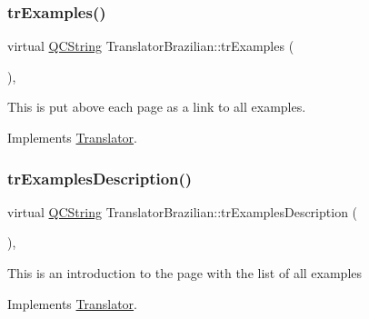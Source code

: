 \mbox{\label{class_translator_brazilian_ac28d1f1400883ca9671356b129312823}} 
\subsubsection{\texorpdfstring{trExamples()}{trExamples()}}
{\footnotesize\ttfamily virtual \mbox{\hyperlink{class_q_c_string}{Q\+C\+String}} Translator\+Brazilian\+::tr\+Examples (\begin{DoxyParamCaption}{ }\end{DoxyParamCaption})\hspace{0.3cm}{\ttfamily [inline]}, {\ttfamily [virtual]}}

This is put above each page as a link to all examples. 

Implements \mbox{\hyperlink{class_translator}{Translator}}.

\mbox{\label{class_translator_brazilian_a0735b11722a71ac5fab8825898ec5e7b}} 
\subsubsection{\texorpdfstring{trExamplesDescription()}{trExamplesDescription()}}
{\footnotesize\ttfamily virtual \mbox{\hyperlink{class_q_c_string}{Q\+C\+String}} Translator\+Brazilian\+::tr\+Examples\+Description (\begin{DoxyParamCaption}{ }\end{DoxyParamCaption})\hspace{0.3cm}{\ttfamily [inline]}, {\ttfamily [virtual]}}

This is an introduction to the page with the list of all examples 

Implements \mbox{\hyperlink{class_translator}{Translator}}.

\mbox{\label{class_translator_brazilian_a7a219a83f418bca28639f2ae0ddc0764}} 
